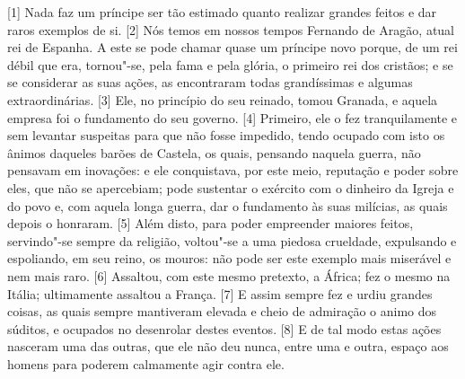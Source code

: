 {[}1{]} Nada faz um príncipe ser tão estimado quanto realizar grandes
feitos e dar raros exemplos de si. {[}2{]} Nós temos em nossos tempos
Fernando de Aragão,
atual rei de Espanha. A este se pode chamar quase um príncipe novo
porque, de um rei débil que era, tornou"-se, pela fama e pela glória, o
primeiro rei dos cristãos; e se se considerar as suas ações, as
encontraram todas grandíssimas e algumas extraordinárias. {[}3{]} Ele,
no princípio do seu reinado, tomou Granada, e aquela empresa foi o fundamento do seu
governo. {[}4{]} Primeiro, ele o fez tranquilamente e sem levantar
suspeitas para que não fosse impedido, tendo ocupado com isto os ânimos
daqueles barões de Castela, os quais, pensando naquela guerra, não
pensavam em inovações: e ele conquistava, por este
meio, reputação e poder sobre eles, que não se apercebiam; pode
sustentar o exército com o dinheiro da Igreja e do povo e, com aquela
longa guerra, dar o fundamento às suas milícias, as quais depois o
honraram. {[}5{]} Além disto, para poder empreender maiores feitos,
servindo"-se sempre da religião, voltou"-se a uma piedosa crueldade,
expulsando e espoliando, em seu reino, os mouros: não pode ser este exemplo mais miserável
e nem mais raro. {[}6{]} Assaltou, com este mesmo pretexto, a
África; fez o
mesmo na Itália;
ultimamente assaltou a França. {[}7{]} E assim sempre fez e urdiu
grandes coisas, as quais sempre mantiveram elevada e cheio de admiração
o animo dos súditos, e ocupados no desenrolar destes eventos. {[}8{]} E
de tal modo estas ações nasceram uma das outras, que ele não deu nunca,
entre uma e outra, espaço aos homens para poderem calmamente agir contra
ele.

